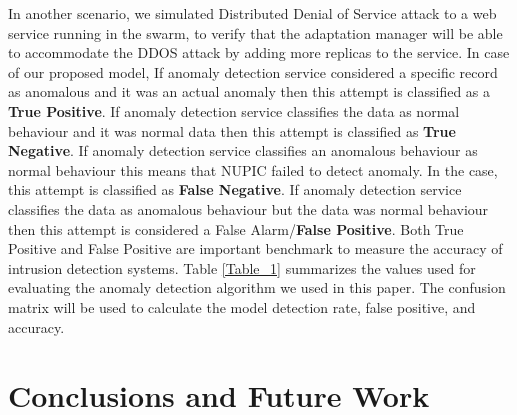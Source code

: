 \documentclass[graybox]{svmult}
\begin{document}
In another scenario, we simulated Distributed Denial of Service attack to a web service running in the swarm, to verify that the adaptation manager will be able to accommodate the DDOS attack by adding more replicas to the service. In case of our proposed model, If  anomaly detection service considered a specific record as anomalous and it was an actual anomaly then this attempt is classified as a \textbf{True Positive}. If  anomaly detection service  classifies the data as normal behaviour and it was normal data then this attempt is classified as \textbf{True Negative}. If  anomaly detection service  classifies an anomalous behaviour as normal behaviour this means that NUPIC failed to detect anomaly. In the case, this attempt is classified as \textbf{False Negative}. If  anomaly detection service  classifies the data as anomalous behaviour but the data was normal behaviour then this attempt is considered a False Alarm/\textbf{False Positive}. Both True Positive and False Positive are important benchmark to measure the accuracy of intrusion detection systems. Table \ref{Table_1} summarizes the values used for evaluating the anomaly detection algorithm we used in this paper. The confusion matrix will be used to calculate the model detection rate, false positive, and accuracy. 


\begin{table}[h!]
\centering
\caption{Results of the proposed anomalies detection model on confusion matrix}
\end{table}




\section{Conclusions and Future Work}\label{sec:Conclusion}
\end{document}
